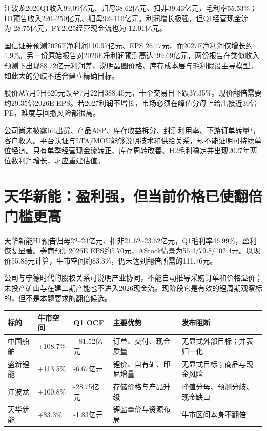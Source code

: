 江波龙2026Q1收入99.09亿元、归母38.62亿元、扣非39.43亿元，毛利率55.53\%；H1预告收入220--250亿元、归母92--110亿元。利润增长极强，但Q1经营现金流为-28.75亿元，FY2025经营现金流也为-12.01亿元。

国信证券预测2026E净利润110.97亿元、EPS 26.47元，而2027E净利润仅增长约1.9\%。另一份原始报告对2026E净利润预测高达199.69亿元，两份报告在类似收入预测下出现88.72亿元利润差，说明晶圆价格、库存成本层与毛利假设主导模型。如此大的分歧不适合建立精确目标。

股价从7月9日620元跌至7月22日388.45元，十个交易日下跌37.35\%。现价翻倍需要约29.35倍2026E EPS。若2027利润不增长，市场必须在峰值分母上给出接近30倍PE，难度与回撤风险都很高。

\begin{riskbox}[核心阻断]
公司尚未披露bit出货、产品ASP、库存收益拆分、封测利用率、下游订单转量与客户收入。平台认证与LTA/MOU能够说明技术和供给关系，却不能证明可持续单位经济。只有单季经营现金流转正、库存周转改善、H2毛利稳定并出现2027年两位数利润增长，才应重建估值。
\end{riskbox}

\section{天华新能：盈利强，但当前价格已使翻倍门槛更高}

天华新能H1预告归母22--24亿元、扣非21.62--23.62亿元，Q1毛利率46.99\%，盈利恢复显著。券商预测2026E EPS约5.70元，AStock情景为56.4/79.8/102.4元。以现价55.88元计算，牛市空间约83.3\%，仍未达到翻倍所需的111.76元。

公司与宁德时代的股权关系可说明产业协同，不能自动推导采购订单和价格溢价；未投产矿山与在建二期产能也不进入2026现金流。现阶段它是有效的锂周期观察标的，但不是本题要求的翻倍候选。

\begin{exhibitbox}
\small
\begin{tabularx}{\exhibitboxwidth}{L{2.4cm} R{1.5cm} R{1.5cm} X L{3.2cm}}
\toprule
标的 & 牛市空间 & Q1 OCF & 主要优势 & 发布阻断 \\
\midrule
中国船舶 & +108.7\% & +81.52亿元 & 订单、交付、现金质量 & 无显式外部目标；并表归一化 \\
盛新锂能 & +113.5\% & -6.67亿元 & 锂价、自有矿、印尼增量 & 无显式目标；商品与现金风险 \\
江波龙 & +100.8\% & -28.75亿元 & 存储价格与产品升级 & 峰值分母、预测分歧、现金缺口 \\
天华新能 & +83.3\% & -1.83亿元 & 锂盐量价与资源布局 & 牛市区间本身不翻倍 \\
\bottomrule
\end{tabularx}
\end{exhibitbox}

\clearpage
